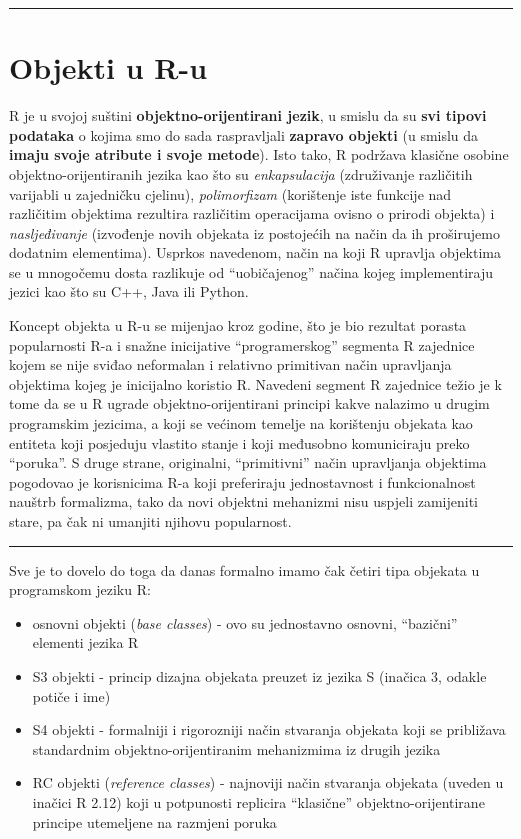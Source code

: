 \documentclass[]{book}
\providecommand{\tightlist}{%
  \setlength{\itemsep}{0pt}\setlength{\parskip}{0pt}}
\theoremstyle{definition}
\theoremstyle{definition}
\theoremstyle{definition}
\theoremstyle{remark}
\begin{document}
\begin{center}\rule{0.5\linewidth}{\linethickness}\end{center}

\section{Objekti u R-u}\label{objekti-u-r-u}

R je u svojoj suštini \textbf{objektno-orijentirani jezik}, u smislu da
su \textbf{svi tipovi podataka} o kojima smo do sada raspravljali
\textbf{zapravo objekti} (u smislu da \textbf{imaju svoje atribute i
svoje metode}). Isto tako, R podržava klasične osobine
objektno-orijentiranih jezika kao što su \emph{enkapsulacija}
(združivanje različitih varijabli u zajedničku cjelinu),
\emph{polimorfizam} (korištenje iste funkcije nad različitim objektima
rezultira različitim operacijama ovisno o prirodi objekta) i
\emph{nasljeđivanje} (izvođenje novih objekata iz postojećih na način da
ih proširujemo dodatnim elementima). Usprkos navedenom, način na koji R
upravlja objektima se u mnogočemu dosta razlikuje od ``uobičajenog''
načina kojeg implementiraju jezici kao što su C++, Java ili Python.

Koncept objekta u R-u se mijenjao kroz godine, što je bio rezultat
porasta popularnosti R-a i snažne inicijative ``programerskog'' segmenta
R zajednice kojem se nije sviđao neformalan i relativno primitivan način
upravljanja objektima kojeg je inicijalno koristio R. Navedeni segment R
zajednice težio je k tome da se u R ugrade objektno-orijentirani
principi kakve nalazimo u drugim programskim jezicima, a koji se većinom
temelje na korištenju objekata kao entiteta koji posjeduju vlastito
stanje i koji međusobno komuniciraju preko ``poruka''. S druge strane,
originalni, ``primitivni'' način upravljanja objektima pogodovao je
korisnicima R-a koji preferiraju jednostavnost i funkcionalnost nauštrb
formalizma, tako da novi objektni mehanizmi nisu uspjeli zamijeniti
stare, pa čak ni umanjiti njihovu popularnost.

\begin{center}\rule{0.5\linewidth}{\linethickness}\end{center}

Sve je to dovelo do toga da danas formalno imamo čak četiri tipa
objekata u programskom jeziku R:

\begin{itemize}
\tightlist
\item
  osnovni objekti (\emph{base classes}) - ovo su jednostavno osnovni,
  ``bazični'' elementi jezika R
\item
  S3 objekti - princip dizajna objekata preuzet iz jezika S (inačica 3,
  odakle potiče i ime)
\item
  S4 objekti - formalniji i rigorozniji način stvaranja objekata koji se
  približava standardnim objektno-orijentiranim mehanizmima iz drugih
  jezika
\item
  RC objekti (\emph{reference classes}) - najnoviji način stvaranja
  objekata (uveden u inačici R 2.12) koji u potpunosti replicira
  ``klasične'' objektno-orijentirane principe utemeljene na razmjeni
  poruka
\end{itemize}
\end{document}
